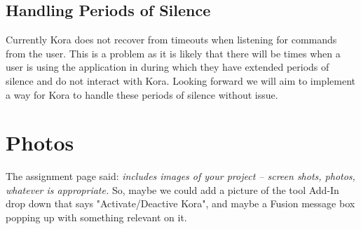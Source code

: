 \documentclass[onecolumn, draftclsnofoot,10pt, compsoc]{IEEEtran}
\begin{document}
    \subsection{Handling Periods of Silence}	
    Currently Kora does not recover from timeouts when listening for commands from the user.
    This is a problem as it is likely that there will be times when a user is using the application in during which they have extended periods of silence and do not interact with Kora.
    Looking forward we will aim to implement a way for Kora to handle these periods of silence without issue.


\section{Photos}
	The assignment page said: \textit{includes images of your project -- screen shots, photos, whatever is appropriate.}
	So, maybe we could add a picture of the tool Add-In drop down that says "Activate/Deactive Kora", and maybe a Fusion message box popping up with something relevant on it.
\end{document}
